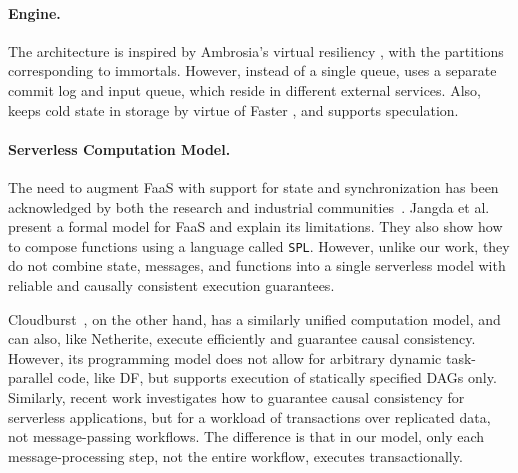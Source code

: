 \paragraph{Engine.} The \sys architecture is inspired by Ambrosia's virtual resiliency \cite{ambrosia}, with the partitions corresponding to immortals. However, instead of a single queue, \sys uses a separate commit log and input queue, which reside in different external services. Also, \sys keeps cold state in storage by virtue of Faster \cite{chandramouli2018faster}, and supports speculation. 

\paragraph{Serverless Computation Model.} The need to augment FaaS with support for state and synchronization has been acknowledged by both the research and industrial communities~\cite{DBLP:conf/cidr/HellersteinFGSS19,DBLP:journals/corr/abs-1902-03383,DBLP:conf/cidr/Schleier-Smith19,8481652}. Jangda et al. \cite{jangda-et-al} present a formal model for FaaS and explain its limitations. They also show how to compose functions using a language called \verb+SPL+. However, unlike our work, they do not combine state, messages, and functions into a single serverless model with reliable and causally consistent execution guarantees. 

Cloudburst~\cite{sreekanti2020cloudburst}, on the other hand, has a similarly unified computation model, and can also, like Netherite, execute efficiently and guarantee causal consistency. However, its programming model does not allow for arbitrary dynamic task-parallel code, like DF, but supports execution of statically specified DAGs only. Similarly, recent work \cite{fault-tolerance-shim,transactional-causal-consistency} investigates how to guarantee causal consistency for serverless applications, but for a workload of transactions over replicated data, not message-passing workflows. The difference is that in our model, only each message-processing step, not the entire workflow, executes transactionally. 

